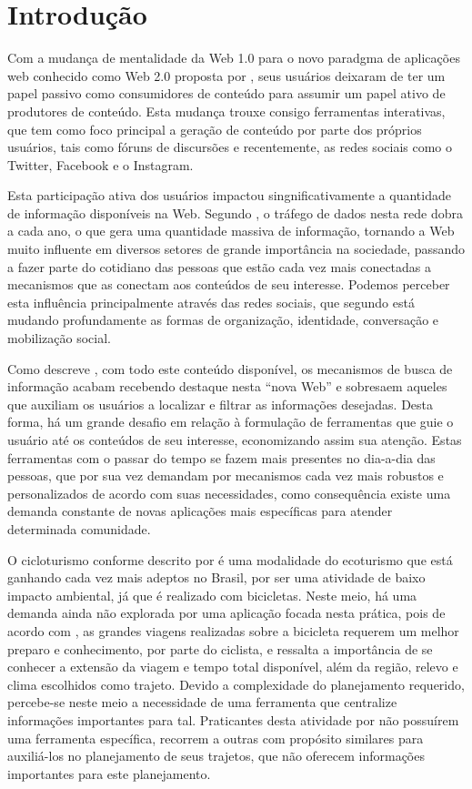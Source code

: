 \section{\esp Introdução}
Com a mudança de mentalidade da Web 1.0 para o novo paradgma de aplicações web conhecido como Web 2.0 proposta por \cite{web20Proposta}, seus 
usuários deixaram de ter um papel passivo como consumidores de conteúdo para assumir um papel ativo de produtores de conteúdo. Esta mudança 
trouxe consigo ferramentas interativas, que tem como foco principal a geração de conteúdo por parte dos próprios usuários, tais como fóruns 
de discursões e recentemente, as redes sociais como o Twitter, Facebook e o Instagram.

Esta participação ativa dos usuários impactou singnificativamente a quantidade de informação disponíveis na Web. Segundo \cite{artigo01}, 
o tráfego de dados nesta rede dobra a cada ano, o que gera uma quantidade massiva de informação, tornando a Web muito influente em diversos 
setores de grande importância na sociedade, passando a fazer parte do cotidiano das pessoas que estão cada vez mais conectadas a mecanismos que
as  conectam aos conteúdos de seu interesse. Podemos perceber esta influência principalmente através das redes sociais, que segundo 
\cite{redesSociais01} está mudando profundamente as formas de organização, identidade, conversação e mobilização social.

Como descreve \cite{deitelAjax}, com todo este conteúdo disponível, os mecanismos de busca de informação 
acabam recebendo destaque nesta ``nova Web'' e sobresaem aqueles que auxiliam os usuários  a localizar e filtrar 
as informações desejadas. Desta forma, há um grande desafio em relação à formulação de ferramentas que guie o usuário até os conteúdos de seu 
interesse, economizando assim sua atenção. Estas ferramentas com o passar do tempo se fazem mais presentes no dia-a-dia das pessoas, 
que por sua vez demandam por mecanismos cada vez mais robustos e personalizados de acordo com suas necessidades, como consequência existe 
uma demanda constante de novas aplicações mais específicas para atender determinada comunidade.

O cicloturismo conforme descrito por \cite{cicloturismo01} é uma modalidade do ecoturismo que está ganhando cada vez mais adeptos no Brasil,
por ser uma atividade de baixo impacto ambiental, já que é realizado com bicicletas. Neste meio, há uma demanda ainda não explorada por 
uma aplicação focada nesta prática, pois de acordo com \cite{cicloturismo02}, as grandes viagens realizadas sobre a bicicleta requerem um melhor
preparo e conhecimento, por parte do ciclista, e ressalta a importância de se conhecer a extensão da viagem e tempo total disponível, além da 
região, relevo e clima escolhidos como trajeto. Devido a complexidade do planejamento requerido, percebe-se neste meio a necessidade de 
uma ferramenta que centralize informações importantes para tal. Praticantes desta atividade por não possuírem uma ferramenta específica, 
recorrem a outras com propósito similares para auxiliá-los no planejamento de seus trajetos, que não oferecem informações importantes para este 
planejamento.

